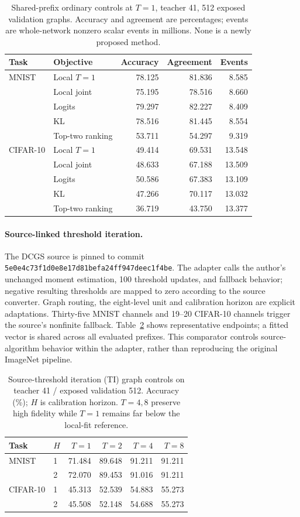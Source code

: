\documentclass[10pt,twocolumn,letterpaper]{article}
\begin{document}
\begin{table}[t]\centering\small
\caption{Shared-prefix ordinary controls at $T=1$, teacher 41, 512 exposed validation graphs. Accuracy and agreement are percentages; events are whole-network nonzero scalar events in millions. None is a newly proposed method.}
\label{tab:objectives}
\setlength{\tabcolsep}{3pt}\begin{tabular}{llrrr}\toprule
Task & Objective & Accuracy & Agreement & Events\\\midrule
MNIST & Local $T=1$ &78.125&81.836&8.585\\
 & Local joint &75.195&78.516&8.660\\
 & Logits &79.297&82.227&8.409\\
 & KL &78.516&81.445&8.554\\
 & Top-two ranking &53.711&54.297&9.319\\\midrule
CIFAR-10 & Local $T=1$ &49.414&69.531&13.548\\
 & Local joint &48.633&67.188&13.509\\
 & Logits &50.586&67.383&13.109\\
 & KL &47.266&70.117&13.032\\
 & Top-two ranking &36.719&43.750&13.377\\\bottomrule
\end{tabular}\end{table}

\paragraph{Source-linked threshold iteration.} The DCGS source is pinned to commit \texttt{5e0e4c73f1d0e8e17d81befa24ff947deec1f4be}. The adapter calls the author's unchanged moment estimation, 100 threshold updates, and fallback behavior; negative resulting thresholds are mapped to zero according to the source converter. Graph routing, the eight-level unit and calibration horizon are explicit adaptations. Thirty-five MNIST channels and 19--20 CIFAR-10 channels trigger the source's nonfinite fallback. Table~\ref{tab:ti} shows representative endpoints; a fitted vector is shared across all evaluated prefixes. This comparator controls source-algorithm behavior within the adapter, rather than reproducing the original ImageNet pipeline.

\begin{table}[t]\centering\small
\caption{Source-threshold iteration (TI) graph controls on teacher 41 / exposed validation 512. Accuracy (\%); $H$ is calibration horizon. $T=4,8$ preserve high fidelity while $T=1$ remains far below the local-fit reference.}
\label{tab:ti}
\begin{tabular}{llrrrr}\toprule
Task & $H$ & $T=1$ & $T=2$ & $T=4$ & $T=8$\\\midrule
MNIST & 1&71.484&89.648&91.211&91.211\\
 &2&72.070&89.453&91.016&91.211\\
CIFAR-10 &1&45.313&52.539&54.883&55.273\\
 &2&45.508&52.148&54.688&55.273\\\bottomrule
\end{tabular}\end{table}
\end{document}
